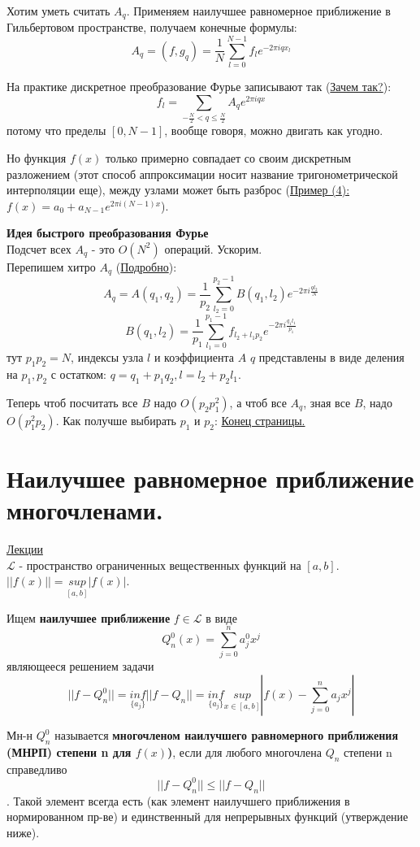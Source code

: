 \documentclass[specialist, subf, href, colorlinks=true, 12pt, times, mtpro, final]{disser}
\theoremstyle{definition}
\begin{document}
	Хотим уметь считать $A_q$. Применяем наилучшее равномерное приближение в Гильбертовом пространстве, получаем конечные формулы:
	$$
		A_q = (f, g_q) = \frac{1}{N}\sum\limits_{l = 0}^{N-1}f_le^{-2\pi i qx_l}
	$$
	
	На практике дискретное преобразование Фурье записывают так (\hyperlink {lects.33}{Зачем так?}):
	$$
		f_l = \sum\limits_{-\frac{N}{2} < q \le \frac{N}{2}} A_q e ^{2\pi i qx}
	$$
	потому что пределы $[0,N-1]$, вообще говоря, можно двигать как угодно.
	
	Но функция $f(x)$ только примерно совпадает со своим дискретным разложением (этот способ аппроксимации носит название тригонометрической интерполяции еще), между узлами может быть разброс (\hyperlink {lects.33}{Пример (4):} $f(x) = a_0 + a_{N-1}e^{2\pi i (N-1)x}$).
	
	\textbf{Идея быстрого преобразования Фурье} \\
	Подсчет всех $A_q$ - это $O(N^2)$ операций. Ускорим.\\
	Перепишем хитро $A_q$ (\hyperlink {lects.34}{Подробно}):
	$$
		A_q = A(q_1, q_2) = \frac{1}{p_2}\sum\limits_{l_2 = 0}^{p_2 - 1} B(q_1, l_2)e^{-2\pi i \frac{ql_2}{N}}
	$$
	$$
		B(q_1, l_2) = \frac{1}{p_1}\sum\limits_{l_1 = 0}^{p_1 - 1}f_{l_2 + l_1p_2}e^{-2\pi i \frac{q_1l_1}{p_1}}
	$$
	тут $p_1p_2 = N$, индексы узла $l$ и коэффициента $A$ $q$ представлены в виде деления на $p_1, p_2$ с остатком: $q = q_1 + p_1q_2, l = l_2 + p_2l_1$.
	
	Теперь чтоб посчитать все $B$ надо $O(p_2p_1^2)$, а чтоб все $A_q$, зная все $B$, надо $O(p_1^2p_2)$. 
	Как получше выбирать $p_1$ и $p_2$: \hyperlink {lects.34}{Конец страницы.}

\section {Наилучшее равномерное приближение многочленами.}
	\hyperlink {lects.35}{Лекции}\\
	$\mathcal{L}$ - пространство ограниченных вещественных функций на $[a,b]$. $||f(x)|| = \underset{[a,b]}{sup}|f(x)|$.
	
	Ищем \textbf{наилучшее приближение} $f\in \mathcal{L}$ в виде
	$$
		Q_n^0 (x) = \sum\limits_{j=0}^{n}a_j^0x^j
	$$
	являющееся решением задачи
	$$
		||f - Q_n^0|| = \underset{\{a_j\}}{inf}||f-Q_n|| = \underset{\{a_j\}}{inf} \underset{x\in [a,b]}{sup} |f(x) - \sum\limits_{j=0}^{n} a_jx^j|
	$$
	
	Мн-н $Q_n^0$ называется \textbf{многочленом наилучшего равномерного приближения (МНРП) степени n для $f(x)$)}, если для любого многочлена $Q_n$ степени n справедливо $$||f-Q_n^0|| \le ||f-Q_n||$$. Такой элемент всегда есть (как элемент наилучшего приближения в нормированном пр-ве) и единственный для непрерывных функций (утверждение ниже).
	
\end{document}
